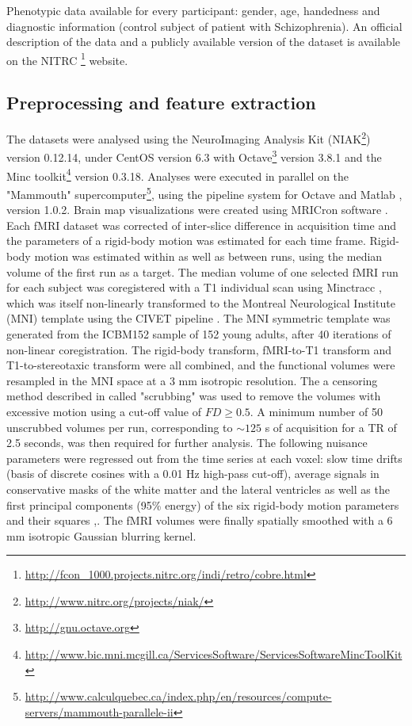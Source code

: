 \documentclass[12pt,journal,compsoc]{IEEEtran}
\begin{document}
Phenotypic data available for every participant: gender, age, handedness and diagnostic information (control subject of patient with Schizophrenia).
An official description of the data and a publicly available version of the dataset is available on the NITRC \footnote{\url{http://fcon_1000.projects.nitrc.org/indi/retro/cobre.html}} website.


\subsection{Preprocessing and feature extraction}
The datasets were analysed using the NeuroImaging Analysis Kit (NIAK\footnote{\url{http://www.nitrc.org/projects/niak/}}) version 0.12.14, under CentOS version 6.3 with Octave\footnote{\url{http://gnu.octave.org}} version 3.8.1 and the Minc toolkit\footnote{\url{http://www.bic.mni.mcgill.ca/ServicesSoftware/ServicesSoftwareMincToolKit}} version 0.3.18. Analyses were executed in parallel on the "Mammouth" supercomputer\footnote{\url{http://www.calculquebec.ca/index.php/en/resources/compute-servers/mammouth-parallele-ii}}, using the pipeline system for Octave and Matlab \cite{Bellec2010}, version 1.0.2. Brain map visualizations were created using MRICron software \cite{Rorden2007}. Each fMRI dataset was corrected of inter-slice difference in acquisition time and the parameters of a rigid-body motion was estimated for each time frame. Rigid-body motion was estimated within as well as between runs, using the median volume of the first run as a target. The median volume of one selected fMRI run for each subject was coregistered with a T1 individual scan using Minctracc \cite{Collins1998}, which was itself non-linearly transformed to the Montreal Neurological Institute (MNI) template \cite{Fonov2011} using the CIVET pipeline \cite{Zijdenbos2002}. The MNI symmetric template was generated from the ICBM152 sample of 152 young adults, after 40 iterations of non-linear coregistration. The rigid-body transform, fMRI-to-T1 transform and T1-to-stereotaxic transform were all combined, and the functional volumes were resampled in the MNI space at a 3 mm isotropic resolution. The a censoring method described in \cite{Power2012} called "scrubbing" was used to remove the volumes with excessive motion using a cut-off value of $FD\geq0.5$. A minimum number of 50 unscrubbed volumes per run, corresponding to $\sim 125$ s of acquisition for a TR of 2.5 seconds, was then required for further analysis. The following nuisance parameters were regressed out from the time series at each voxel: slow time drifts (basis of discrete cosines with a 0.01 Hz high-pass cut-off), average signals in conservative masks of the white matter and the lateral ventricles as well as the first principal components (95\% energy) of the six rigid-body motion parameters and their squares \cite{Lund2006},\cite{Giove2009}. The fMRI volumes were finally spatially smoothed with a 6 mm isotropic Gaussian blurring kernel. 
\end{document}
